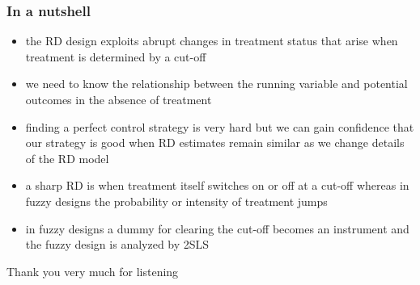 \documentclass{beamer}
\begin{document}
\begin{frame}
\frametitle{In a nutshell}
\begin{itemize}
\item the RD design exploits abrupt changes in treatment status that arise when treatment is determined by a cut-off
\item we need to know the relationship between the running variable and potential outcomes in the absence of treatment
\item finding a perfect control strategy is very hard but we can gain confidence that our strategy is good when RD estimates remain similar as we change details of the RD model
\item a sharp RD is when treatment itself switches on or off at a cut-off whereas in fuzzy designs the probability or intensity of treatment jumps
\item in fuzzy designs a dummy for clearing the cut-off becomes an instrument and the fuzzy design is analyzed by 2SLS
\end{itemize}
\end{frame}




\begin{frame}
\Huge{\centerline{Thank you very much for listening}}
\end{frame}

\end{document}
